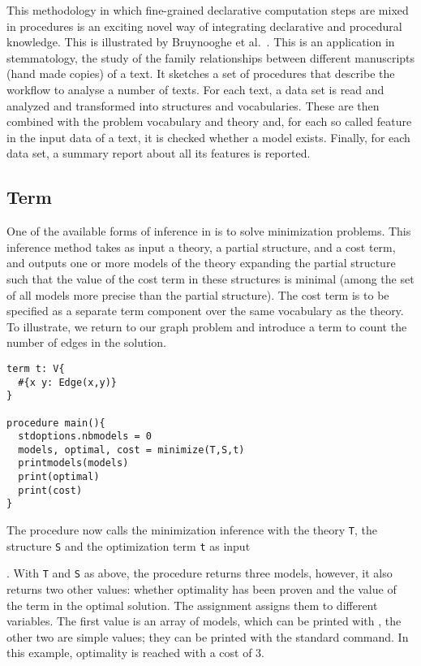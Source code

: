 This methodology in which fine-grained declarative computation steps are mixed in procedures is an exciting novel way of integrating declarative and procedural knowledge. 
This is illustrated by Bruynooghe et al.~\cite{TPLP/BruynoogheBBDDJLRDV}. This is an application in stemmatology, the study of the family
relationships between different manuscripts (hand made copies) of a
text. It sketches a set of procedures that describe the workflow to
analyse a number of texts. For each text, a data set is read and
analyzed and transformed into structures and vocabularies. These are
then combined with the problem vocabulary and theory and, for each so
called feature in the input data of a text, it is checked whether a
model exists. Finally, for each data set, a summary report about all
its features is reported.

\subsection{Term}\label{sec:term}
One of the available forms of inference in \idp is to solve minimization problems. This inference method  takes as input a theory, a partial structure, and a cost term, and outputs one or more models of the theory expanding the partial structure such that the value of the cost term in these structures is minimal (among the set of all models more precise than the partial structure).  The cost term is to be specified as a separate term
component over the same vocabulary as the theory. To
illustrate, we return to our graph problem and introduce a term to
count the number of edges in the solution. 
\begin{lstlisting}
term t: V{
  #{x y: Edge(x,y)}
}

procedure main(){
  stdoptions.nbmodels = 0
  models, optimal, cost = minimize(T,S,t)
  printmodels(models)
  print(optimal)
  print(cost)
}   
\end{lstlisting}
The  procedure now calls the minimization inference with the
theory \lstinline{T}, the structure \lstinline{S} and the optimization term \lstinline{t} as
input. With \lstinline{T} and \lstinline{S} as above,
the procedure returns three models, however, it also returns two other
values: whether optimality has been proven and the value of the term
in the optimal solution. The assignment 
assigns them to different variables. The first value is an array of
models, which can be printed with , the other two are
simple values; they can be printed with the standard 
command. In this example, optimality is reached with a cost of 3.

